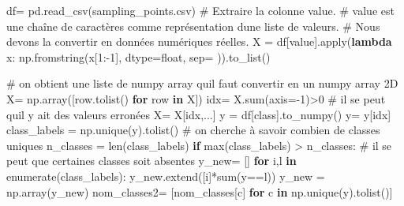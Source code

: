 \documentclass[
  11pt,
  letterpaper,
  open=any,
  twoside=false,
  french]{scrbook}
\newenvironment{Shaded}{\begin{snugshade}}{\end{snugshade}}
\newcommand{\BuiltInTok}[1]{\textcolor[rgb]{0.00,0.23,0.31}{#1}}
\newcommand{\CommentTok}[1]{\textcolor[rgb]{0.37,0.37,0.37}{#1}}
\newcommand{\ControlFlowTok}[1]{\textcolor[rgb]{0.00,0.23,0.31}{\textbf{#1}}}
\newcommand{\DecValTok}[1]{\textcolor[rgb]{0.68,0.00,0.00}{#1}}
\newcommand{\KeywordTok}[1]{\textcolor[rgb]{0.00,0.23,0.31}{\textbf{#1}}}
\newcommand{\NormalTok}[1]{\textcolor[rgb]{0.00,0.23,0.31}{#1}}
\newcommand{\OperatorTok}[1]{\textcolor[rgb]{0.37,0.37,0.37}{#1}}
\newcommand{\StringTok}[1]{\textcolor[rgb]{0.13,0.47,0.30}{#1}}
\begin{document}
\begin{Shaded}
\begin{Highlighting}[]
\NormalTok{df}\OperatorTok{=}\NormalTok{ pd.read\_csv(}\StringTok{\textquotesingle{}sampling\_points.csv\textquotesingle{}}\NormalTok{)}
\CommentTok{\# Extraire la colonne \textquotesingle{}value\textquotesingle{}.}
\CommentTok{\# \textquotesingle{}value\textquotesingle{} est une chaîne de caractères comme représentation d\textquotesingle{}une liste de valeurs.}
\CommentTok{\# Nous devons la convertir en données numériques réelles.}
\NormalTok{X }\OperatorTok{=}\NormalTok{ df[}\StringTok{\textquotesingle{}value\textquotesingle{}}\NormalTok{].}\BuiltInTok{apply}\NormalTok{(}\KeywordTok{lambda}\NormalTok{ x: np.fromstring(x[}\DecValTok{1}\NormalTok{:}\OperatorTok{{-}}\DecValTok{1}\NormalTok{], dtype}\OperatorTok{=}\BuiltInTok{float}\NormalTok{, sep}\OperatorTok{=}\StringTok{\textquotesingle{} \textquotesingle{}}\NormalTok{)).to\_list()}

\CommentTok{\# on obtient une liste de numpy array  qu\textquotesingle{}il faut convertir en un numpy array 2D}
\NormalTok{X}\OperatorTok{=}\NormalTok{ np.array([row.tolist() }\ControlFlowTok{for}\NormalTok{ row }\KeywordTok{in}\NormalTok{ X])}
\NormalTok{idx}\OperatorTok{=}\NormalTok{ X.}\BuiltInTok{sum}\NormalTok{(axis}\OperatorTok{={-}}\DecValTok{1}\NormalTok{)}\OperatorTok{\textgreater{}}\DecValTok{0} \CommentTok{\# il se peut qu\textquotesingle{}il y ait des valeurs erronées}
\NormalTok{X}\OperatorTok{=}\NormalTok{ X[idx,...]}
\NormalTok{y }\OperatorTok{=}\NormalTok{ df[}\StringTok{\textquotesingle{}class\textquotesingle{}}\NormalTok{].to\_numpy()}
\NormalTok{y}\OperatorTok{=}\NormalTok{ y[idx]}
\NormalTok{class\_labels }\OperatorTok{=}\NormalTok{ np.unique(y).tolist() }\CommentTok{\# on cherche à savoir combien de classes uniques}
\NormalTok{n\_classes }\OperatorTok{=} \BuiltInTok{len}\NormalTok{(class\_labels)}
\ControlFlowTok{if} \BuiltInTok{max}\NormalTok{(class\_labels) }\OperatorTok{\textgreater{}}\NormalTok{ n\_classes: }\CommentTok{\# il se peut que certaines classes soit absentes}
\NormalTok{  y\_new}\OperatorTok{=}\NormalTok{ []}
  \ControlFlowTok{for}\NormalTok{ i,l }\KeywordTok{in} \BuiltInTok{enumerate}\NormalTok{(class\_labels):}
\NormalTok{    y\_new.extend([i]}\OperatorTok{*}\BuiltInTok{sum}\NormalTok{(y}\OperatorTok{==}\NormalTok{l))}
\NormalTok{  y\_new }\OperatorTok{=}\NormalTok{ np.array(y\_new)}
\NormalTok{nom\_classes2}\OperatorTok{=}\NormalTok{ [nom\_classes[c] }\ControlFlowTok{for}\NormalTok{ c }\KeywordTok{in}\NormalTok{ np.unique(y).tolist()]}
\end{Highlighting}
\end{Shaded}
\end{document}
